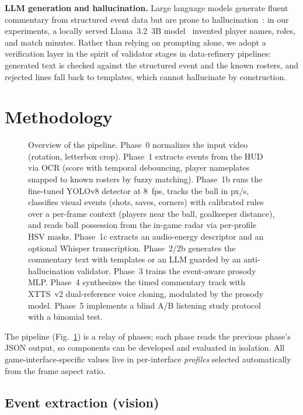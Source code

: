 \documentclass[10pt,twocolumn,a4paper]{article}
\begin{document}
	\textbf{LLM generation and hallucination.} Large language models generate fluent commentary from structured event data but are prone to hallucination~\cite{ji2023hallucination}: in our experiments, a locally served Llama~3.2~3B model~\cite{grattafiori2024llama} invented player names, roles, and match minutes. Rather than relying on prompting alone, we adopt a verification layer in the spirit of validator stages in data-refinery pipelines: generated text is checked against the structured event and the known rosters, and rejected lines fall back to templates, which cannot hallucinate by construction.

	\section{Methodology}

	\begin{figure}[t]
		\centering
		\caption{Overview of the pipeline. Phase~0 normalizes the input video (rotation, letterbox crop). Phase~1 extracts events from the HUD via OCR (score with temporal debouncing, player nameplates snapped to known rosters by fuzzy matching). Phase~1b runs the fine-tuned YOLOv8 detector at 8~fps, tracks the ball in px/s, classifies visual events (shots, saves, corners) with calibrated rules over a per-frame context (players near the ball, goalkeeper distance), and reads ball possession from the in-game radar via per-profile HSV masks. Phase~1c extracts an audio-energy descriptor and an optional Whisper transcription. Phase~2/2b generates the commentary text with templates or an LLM guarded by an anti-hallucination validator. Phase~3 trains the event-aware prosody MLP. Phase~4 synthesizes the timed commentary track with XTTS~v2 dual-reference voice cloning, modulated by the prosody model. Phase~5 implements a blind A/B listening study protocol with a binomial test.}
		\label{fig:architecture}
	\end{figure}

	The pipeline (Fig.~\ref{fig:architecture}) is a relay of phases; each phase reads the previous phase's JSON output, so components can be developed and evaluated in isolation. All game-interface-specific values live in per-interface \emph{profiles} selected automatically from the frame aspect ratio.

	\subsection{Event extraction (vision)}
\end{document}
